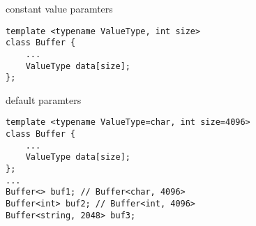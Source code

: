 \begin{frame}[fragile,label=constValParam]{constant value paramters}
\begin{lstlisting}
template <typename ValueType, int size>
class Buffer {
    ...
    ValueType data[size];
};
\end{lstlisting}
\end{frame}

\begin{frame}[fragile,label=defParam]{default paramters}
\begin{lstlisting}
template <typename ValueType=char, int size=4096>
class Buffer {
    ...
    ValueType data[size];
};
...
Buffer<> buf1; // Buffer<char, 4096>
Buffer<int> buf2; // Buffer<int, 4096>
Buffer<string, 2048> buf3;
\end{lstlisting}
\end{frame}

